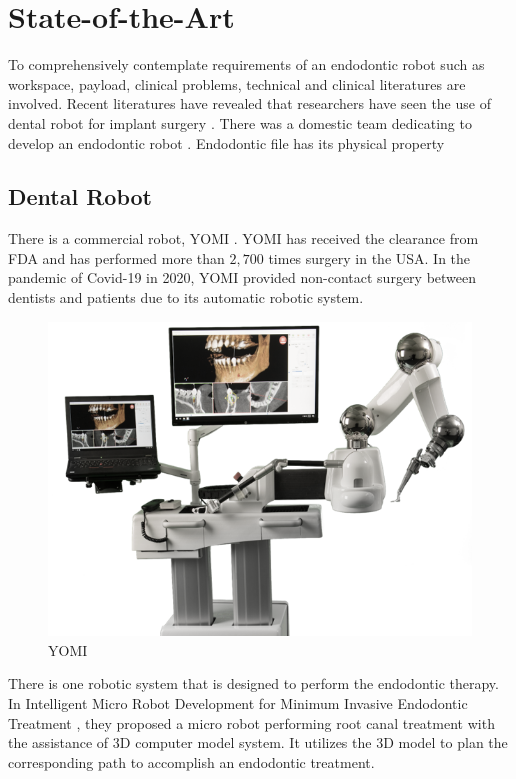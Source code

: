 \chapter{State-of-the-Art}
\hspace*{6mm}
To comprehensively contemplate requirements of an endodontic robot such as workspace, payload, clinical problems, technical and clinical literatures are involved. Recent literatures have revealed that researchers have seen the use of dental robot for implant surgery \cite{Kim2009ASO}\cite{Li2019ACD}\cite{9026216}. There was a domestic team dedicating to develop an endodontic robot \cite{dong2006wip}. Endodontic file has its physical property
\section{Dental Robot}
\hspace*{6mm}There is a commercial robot, YOMI  \cite{bolding2021accuracy}. YOMI has received the clearance from FDA and has performed more than $2,700$ times surgery in the USA. In the pandemic of Covid-19 in 2020, YOMI provided non-contact surgery between dentists and patients due to its automatic robotic system. 
\begin{figure}[htbp]
\begin{center}
\includegraphics[width=0.9\linewidth]{Images/YOMI.png}
\caption{
YOMI
}\label{fig:YOMI}
\end{center}
\end{figure}
There is one robotic system that is designed to perform the endodontic therapy. In Intelligent Micro Robot Development for Minimum Invasive Endodontic Treatment \cite{dong2010design}, they proposed a micro robot performing root canal treatment with the assistance
of 3D computer model system. It utilizes the 3D model to plan the corresponding path to accomplish an endodontic treatment.

